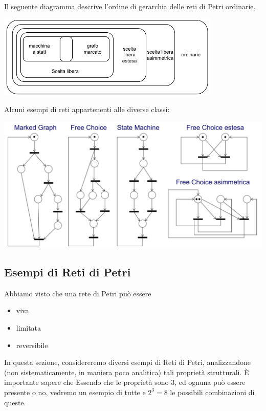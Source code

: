 \documentclass[10pt, letterpaper]{report}
\begin{document}
Il seguente diagramma descrive l'ordine di gerarchia delle reti di Petri ordinarie.
\begin{center}
    \includegraphics[width=0.8\textwidth]{images/GerarchiaPetri.drawio.pdf}
\end{center}
Alcuni esempi di reti appartenenti alle diverse classi:\begin{center}
    \includegraphics[width=\textwidth]{images/PetriEsempi.png}
\end{center}
\subsection{Esempi di Reti di Petri}
Abbiamo visto che una rete di Petri può essere\begin{itemize}
    \item viva 
    \item limitata 
    \item reversibile 
\end{itemize}
In questa sezione, considereremo diversi esempi di Reti di Petri, analizzandone (non sistematicamente, in maniera poco analitica) tali proprietà strutturali. È importante sapere che
Essendo che le proprietà sono 3, ed ognuna può essere presente o no, vedremo un esempio di tutte e $2^3=8$ le possibili combinazioni di queste.
\end{document}

